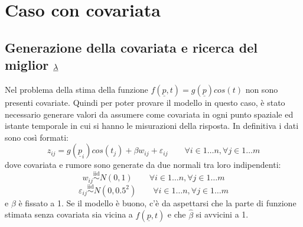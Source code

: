\documentclass[a4paper,11pt,twoside,openright]{book}							%
\begin{document}
\section{Caso con covariata}

\subsection{Generazione della covariata e ricerca del miglior $\protect\underline{\lambda}$}
Nel problema della stima della funzione $f(\underline p,t)=g(\underline p)cos(t)$ non sono presenti covariate. Quindi per poter provare il modello in questo caso, è stato necessario generare valori da assumere come covariata in ogni punto spaziale ed istante temporale in cui si hanno le misurazioni della risposta.
\newpage
In definitiva i dati sono così formati:
$$
z_{ij}=g(\underline p_{i})cos(t_j) + \beta w_{ij} + \varepsilon_{ij} \qquad \forall i \in 1\ldots n, \forall j \in 1\ldots m
$$
dove covariata e rumore sono generate da due normali tra loro indipendenti:
$$
w_{ij}\stackrel{\mathrm{iid}}{\sim}N(0,1) \qquad \forall i \in 1\ldots n, \forall j \in 1\ldots m
$$
$$
\varepsilon_{ij}\stackrel{\mathrm{iid}}{\sim}N(0,0.5^2) \qquad \forall i \in 1\ldots n, \forall j \in 1\ldots m
$$
e $\beta$ è fissato a 1. Se il modello è buono, c'è da aspettarsi che la parte di funzione stimata senza covariata sia vicina a $f(\underline p,t)$ e che $\hat{\beta}$ si avvicini a 1.
 
\end{document}

